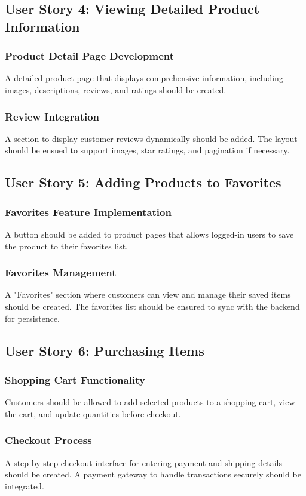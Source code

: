 \documentclass[twoside,a4paper,journal]{IEEEtran}
\begin{document}
\subsection{User Story 4: Viewing Detailed Product Information}
\subsubsection{Product Detail Page Development}
A detailed product page that displays comprehensive information,
including images, descriptions, reviews, and ratings should be created.
\subsubsection{Review Integration}
A section to display customer reviews dynamically should be added.
The layout should be ensued to support images, star ratings,
and pagination if necessary.

\subsection{User Story 5: Adding Products to Favorites}
\subsubsection{Favorites Feature Implementation}
A button should be added to product pages that allows logged-in users to save
the product to their favorites list.
\subsubsection{Favorites Management}
A "Favorites" section where customers can view and manage their saved
items should be created.
The favorites list should be ensured to sync with the backend for persistence.

\subsection{User Story 6: Purchasing Items}
\subsubsection{Shopping Cart Functionality}
Customers should be allowed to add selected products to a shopping cart,
view the cart, and update quantities before checkout.
\subsubsection{Checkout Process}
A step-by-step checkout interface for entering payment and shipping
details should be created.
A payment gateway to handle transactions securely should be integrated.
\end{document}
